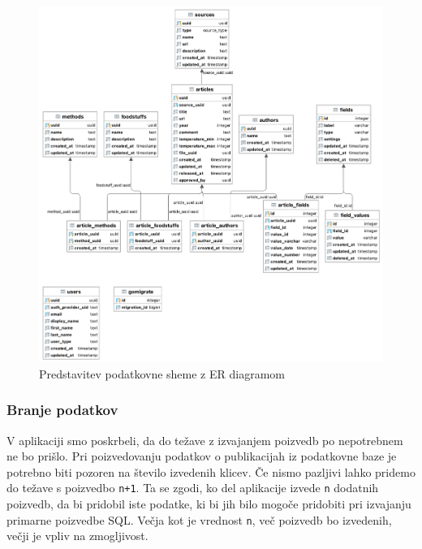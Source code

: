 \documentclass[a4paper, 12pt]{book}
\begin{document}
\begin{figure}[ht]
\begin{center}
\includegraphics[width=1\textwidth]{slike/database-structure.png}
\end{center}
\caption{ Predstavitev podatkovne sheme z ER diagramom }
\label{database-diagram-er}
\end{figure}

\subsubsection{Branje podatkov}
V aplikaciji smo poskrbeli, da do težave z izvajanjem poizvedb po nepotrebnem ne bo prišlo. Pri poizvedovanju podatkov o publikacijah iz podatkovne baze je potrebno biti pozoren na število izvedenih klicev. Če nismo pazljivi lahko pridemo do težave s poizvedbo \verb=n+1=. Ta se zgodi, ko del aplikacije izvede \verb=n= dodatnih poizvedb, da bi pridobil iste podatke, ki bi jih bilo mogoče pridobiti pri izvajanju primarne poizvedbe SQL. Večja kot je vrednost \verb=n=, več poizvedb bo izvedenih, večji je vpliv na zmogljivost. 

\clearpage
\end{document}
